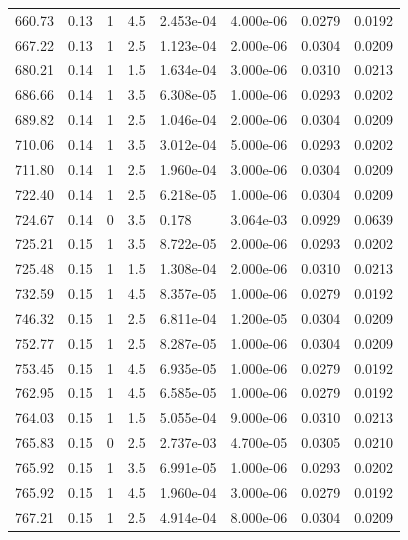 \documentclass[preview]{standalone}
\begin{document}
{{{\begin{tabular}{L{1.2cm}C{1.2cm} C{0.3cm}C{0.5cm} C{1.4cm}C{1.4cm} C{1.4cm}C{1.4cm}}
  660.73  &  0.13  & 1     & 4.5 &  2.453e-04  & 4.000e-06  & 0.0279 &  0.0192   \\ 
  667.22  &  0.13  & 1     & 2.5 &  1.123e-04  & 2.000e-06  & 0.0304 &  0.0209   \\ 
  680.21  &  0.14  & 1     & 1.5 &  1.634e-04  & 3.000e-06  & 0.0310 &  0.0213   \\ 
  686.66  &  0.14  & 1     & 3.5 &  6.308e-05  & 1.000e-06  & 0.0293 &  0.0202   \\ 
  689.82  &  0.14  & 1     & 2.5 &  1.046e-04  & 2.000e-06  & 0.0304 &  0.0209   \\ 
  710.06  &  0.14  & 1     & 3.5 &  3.012e-04  & 5.000e-06  & 0.0293 &  0.0202   \\ 
  711.80  &  0.14  & 1     & 2.5 &  1.960e-04  & 3.000e-06  & 0.0304 &  0.0209   \\ 
  722.40  &  0.14  & 1     & 2.5 &  6.218e-05  & 1.000e-06  & 0.0304 &  0.0209   \\ 
  724.67  &  0.14  & 0     & 3.5 &  0.178  & 3.064e-03  & 0.0929 &  0.0639   \\ 
  725.21  &  0.15  & 1     & 3.5 &  8.722e-05  & 2.000e-06  & 0.0293 &  0.0202   \\ 
  725.48  &  0.15  & 1     & 1.5 &  1.308e-04  & 2.000e-06  & 0.0310 &  0.0213   \\ 
  732.59  &  0.15  & 1     & 4.5 &  8.357e-05  & 1.000e-06  & 0.0279 &  0.0192   \\ 
  746.32  &  0.15  & 1     & 2.5 &  6.811e-04  & 1.200e-05  & 0.0304 &  0.0209   \\ 
  752.77  &  0.15  & 1     & 2.5 &  8.287e-05  & 1.000e-06  & 0.0304 &  0.0209   \\ 
  753.45  &  0.15  & 1     & 4.5 &  6.935e-05  & 1.000e-06  & 0.0279 &  0.0192   \\ 
  762.95  &  0.15  & 1     & 4.5 &  6.585e-05  & 1.000e-06  & 0.0279 &  0.0192   \\ 
  764.03  &  0.15  & 1     & 1.5 &  5.055e-04  & 9.000e-06  & 0.0310 &  0.0213   \\ 
  765.83  &  0.15  & 0     & 2.5 &  2.737e-03  & 4.700e-05  & 0.0305 &  0.0210   \\ 
  765.92  &  0.15  & 1     & 3.5 &  6.991e-05  & 1.000e-06  & 0.0293 &  0.0202   \\ 
  765.92  &  0.15  & 1     & 4.5 &  1.960e-04  & 3.000e-06  & 0.0279 &  0.0192   \\ 
  767.21  &  0.15  & 1     & 2.5 &  4.914e-04  & 8.000e-06  & 0.0304 &  0.0209   \\ 

\end{tabular}}}}
\end{document}
